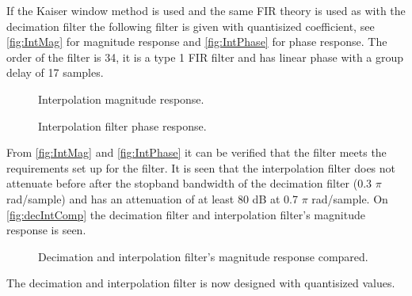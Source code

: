 If the Kaiser window method is used and the same FIR theory is used as with the decimation filter the following filter is given with quantisized coefficient, see \autoref{fig:IntMag} for magnitude response and \autoref{fig:IntPhase} for phase response. The order of the filter is 34, it is a type 1 FIR filter and has linear phase with a group delay of 17 samples.

\begin{figure}[H]
	\centering
	
	\caption{Interpolation magnitude response.}
	\label{fig:IntMag}
\end{figure}

\begin{figure}[H]
	\centering
	
	\caption{Interpolation filter phase response.}
	\label{fig:IntPhase}
\end{figure}

From \autoref{fig:IntMag} and \autoref{fig:IntPhase} it can be verified that the filter meets the requirements set up for the filter. It is seen that the interpolation filter does not attenuate before after the stopband bandwidth of the decimation filter (0.3 $\pi$ rad/sample) and has an attenuation of at least 80 dB at 0.7 $\pi$ rad/sample. On \autoref{fig:decIntComp} the decimation filter and interpolation filter's magnitude response is seen.  

\begin{figure}[H]
	\centering
	
	\caption{Decimation and interpolation filter's magnitude response compared.}
	\label{fig:decIntComp}
\end{figure}

The decimation and interpolation filter is now designed with quantisized values. %